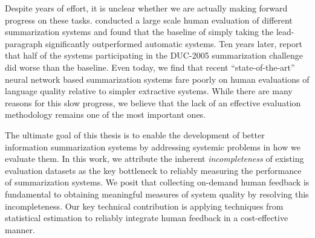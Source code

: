 Despite years of effort, it is unclear whether we are actually making forward progress on these tasks.
\citet{brandow1995automatic} conducted a large scale human evaluation of different summarization systems and found that the baseline of simply taking the lead-paragraph significantly outperformed automatic systems. 
Ten years later, \citet{passonneau2005applying} report that half of the systems participating in the DUC-2005 summarization challenge did worse than the baseline.
Even today, we find that recent ``state-of-the-art'' neural network based summarization systems fare poorly on human evaluations of language quality relative to simpler extractive systems.
While there are many reasons for this slow progress, we believe that the lack of an effective evaluation methodology remains one of the most important ones.

The ultimate goal of this thesis is to enable the development of better information summarization systems by addressing systemic problems in how we evaluate them.
In this work, we attribute the inherent \textit{incompleteness} of existing evaluation datasets as the key bottleneck to reliably measuring the performance of summarization  systems.
We posit that collecting on-demand  human feedback is fundamental to obtaining meaningful measures of system quality by resolving this incompleteness.
Our key technical contribution is applying techniques from statistical estimation to reliably integrate human feedback in a cost-effective manner.

